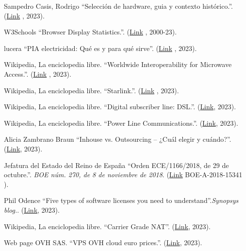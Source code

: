 \documentclass[spanish,final]{setup/eetac_tfc_pfc}
\begin{document}
\begin{thebibliography}{2}
Sampedro Casis, Rodrigo
``Selección de hardware, guia y contexto histórico.''.
(\href{https://github.com/rodrigo-sampedro/tfg_rodrigo_sc/blob/main/extra_documents/Seleccion\%20de\%20Hardware.pdf}{Link} , 2023).

W3Schools
``Browser Display Statistics.''.
(\href{https://www.w3schools.com/browsers/browsers_display.asp}{Link} , 2000-23).

lucera
``PIA electricidad: Qué es y para qué sirve''.
(\href{https://lucera.es/blog/pia-electricidad-que-es-y-para-que-sirve}{Link} , 2023).

Wikipedia, La enciclopedia libre.
``Worldwide Interoperability for Microwave Access.''.
(\href{https://es.wikipedia.org/wiki/WiMAX}{Link} , 2023).

Wikipedia, La enciclopedia libre.
``Starlink.''.
(\href{hhttps://es.wikipedia.org/wiki/Starlink}{Link} , 2023).

Wikipedia, La enciclopedia libre.
``Digital subscriber line: DSL.''.
(\href{https://en.wikipedia.org/wiki/Digital_subscriber_line}{Link}, 2023).

Wikipedia, La enciclopedia libre.
``Power Line Communications.''.
(\href{https://es.wikipedia.org/wiki/Power_Line_Communications}{Link}, 2023).

Alicia Zambrano Braun
``Inhouse vs. Outsourcing – ¿Cuál elegir y cuándo?''.
(\href{https://www.sortlist.es/blog/outsourcing/}{Link}, 2023).

 Jefatura del Estado del Reino de España
``Orden ECE/1166/2018, de 29 de octubre.''. {\it BOE núm. 270, de 8 de noviembre de 2018}.
(\href{https://www.boe.es/diario_boe/txt.php?id=BOE-A-2018-15341}{Link} 
BOE-A-2018-15341 ).

Phil Odence
``Five types of software licenses you need to understand''.{\it Synopsys blog.}.
(\href{https://www.synopsys.com/blogs/software-security/5-types-of-software-licenses-you-need-to-understand.html}{Link}, 2023).

Wikipedia, La enciclopedia libre.
``Carrier Grade NAT''.
(\href{https://es.wikipedia.org/wiki/Carrier_Grade_NAT}{Link}, 2023).

Web page OVH SAS.
``VPS OVH cloud euro prices.''.
(\href{https://www.ovhcloud.com/es-es/vps/}{Link}, 2023).


\end{thebibliography}
\end{document}
